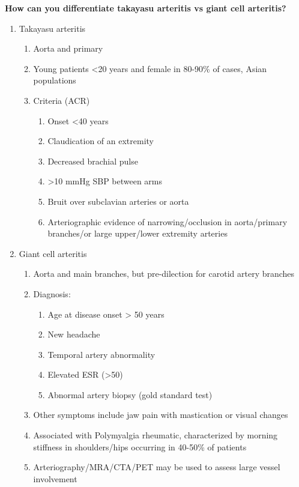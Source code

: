 \documentclass[
]{book}
\begin{document}
\textbf{How can you differentiate takayasu arteritis vs giant cell
arteritis?}

\begin{enumerate}
\def\labelenumi{\arabic{enumi}.}
\item
  Takayasu arteritis~

  \begin{enumerate}
  \def\labelenumii{\arabic{enumii}.}
  \item
    Aorta and primary~
  \item
    Young patients \textless20 years and female in 80-90\% of cases, Asian
    populations
  \item
    Criteria (ACR)

    \begin{enumerate}
    \def\labelenumiii{\arabic{enumiii}.}
    \item
      Onset \textless40 years
    \item
      Claudication of an extremity~
    \item
      Decreased brachial pulse~
    \item
      \textgreater10 mmHg SBP between arms
    \item
      Bruit over subclavian arteries or aorta
    \item
      Arteriographic evidence of narrowing/occlusion in
      aorta/primary branches/or large upper/lower extremity
      arteries
    \end{enumerate}
  \end{enumerate}
\item
  Giant cell arteritis~

  \begin{enumerate}
  \def\labelenumii{\arabic{enumii}.}
  \item
    Aorta and main branches, but pre-dilection for carotid artery
    branches
  \item
    Diagnosis:~

    \begin{enumerate}
    \def\labelenumiii{\arabic{enumiii}.}
    \item
      Age at disease onset \textgreater{} 50 years~
    \item
      New headache
    \item
      Temporal artery abnormality~
    \item
      Elevated ESR (\textgreater50)~
    \item
      Abnormal artery biopsy (gold standard test)
    \end{enumerate}
  \item
    Other symptoms include jaw pain with mastication or visual
    changes
  \item
    Associated with Polymyalgia rheumatic, characterized by morning
    stiffness in shoulders/hips occurring in 40-50\% of patients~
  \item
    Arteriography/MRA/CTA/PET may be used to assess large vessel
    involvement
  \end{enumerate}
\end{enumerate}
\end{document}

